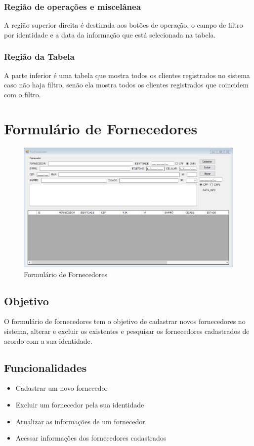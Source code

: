 \documentclass[
	article,			%
	12pt,				%
	oneside,			%
	a4paper,			%
	english,			%
	brazil,				%
	sumario=tradicional
	]{abntex2}
\begin{document}
	\subsubsection{Região de operações e miscelânea}
	A região superior direita é destinada aos botões de operação, o campo de filtro por identidade e a data da informação que está selecionada na tabela.
	\subsubsection{Região da Tabela}
	A parte inferior é uma tabela que mostra todos os clientes registrados no sistema caso não haja filtro, senão ela mostra todos os clientes registrados que coincidem com o filtro.
	\newpage
	\section{Formulário de Fornecedores}
	\begin{figure}[!htb]
		\centering
		\includegraphics[scale=0.6]{../Figuras/FrmFornecedor.png}
		\caption{Formulário de Fornecedores}
	\end{figure}
	\subsection{Objetivo}
	O formulário de fornecedores tem o objetivo de cadastrar novos fornecedores no sistema, alterar e excluir os existentes e pesquisar os fornecedores cadastrados de acordo com a sua identidade.
	\subsection{Funcionalidades}
		\begin{itemize}
		\item Cadastrar um novo fornecedor
		\item Excluir um fornecedor pela sua identidade
		\item Atualizar as informações de um fornecedor
		\item Acessar informações dos fornecedores cadastrados
		\end{itemize}
\end{document}
